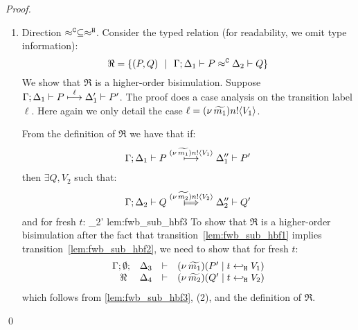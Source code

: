 \begin{proof}
\begin{enumerate}

		\item	Direction $\approx^\mathtt{C} \subseteq \approx^\mathtt{H}$.
				\noi Consider the typed relation (for readability, we omit type information):
				\[
					\Re = \{
								(P, Q) 
								\ \ |\ \ 
								\Gamma; \Delta_1 \vdash P \approx^\mathtt{C} \Delta_2 \vdash Q\}
				\]
				We show that $\Re$ is a higher-order bisimulation.
				Suppose
				$
						\Gamma; \Delta_1 \vdash P \stackrel{ \ell}{\longmapsto} \Delta_1' \vdash P'
				$.
				The proof does a case analysis on the transition label $\ell$.
				Here again we only detail the case $\ell = (\nu\, \widetilde{m_1}) n ! \langle V_1 \rangle$.
				
				\smallskip

							\noi From the definition of $\Re$ we have that if:
							\begin{eqnarray}
								\Gamma; \Delta_1 \vdash P \stackrel{(\nu\, \widetilde{m_1}) n ! \langle V_1 \rangle}{\longmapsto} \Delta_1'' \vdash P'
								\label{lem:fwb_sub_hbf1}
							\end{eqnarray}
							then $\exists Q, V_2$ such that:
							\begin{eqnarray}
								\horel{\Gamma}{\Delta_2}{Q}{\Hby{\news{\widetilde{m_2}} \bactout{n}{V_2}}}{\Delta_2''}{Q'}
								\label{lem:fwb_sub_hbf2}
							\end{eqnarray}
							and for fresh $t$:
								{\fwb}
								{\Delta_2'}{}
								{lem:fwb_sub_hbf3}
							\noi 
							To show that $\Re$ is a higher-order bisimulation
							after the fact that transition~\eqref{lem:fwb_sub_hbf1} implies transition~\eqref{lem:fwb_sub_hbf2},
							we need to show that for fresh $t$:
							\begin{eqnarray}
								\begin{array}{rcll} \Gamma; \emptyset; &\Delta_3& \vdash& (\nu\, \widetilde{m_1})(P' \;|\; t \hookleftarrow_{\mathtt{H}} V_1)\\ \ \Re\  &\Delta_4& \vdash &  (\nu\, \widetilde{m_2})(Q' \;|\; t \hookleftarrow_{\mathtt{H}} V_2) \end{array}
								\label{lem:fwb_sub_hbf4}
							\end{eqnarray}
							which follows from \eqref{lem:fwb_sub_hbf3}, (2),
							and the definition of $\Re$.

	\end{enumerate}
	\qed
\end{proof}


